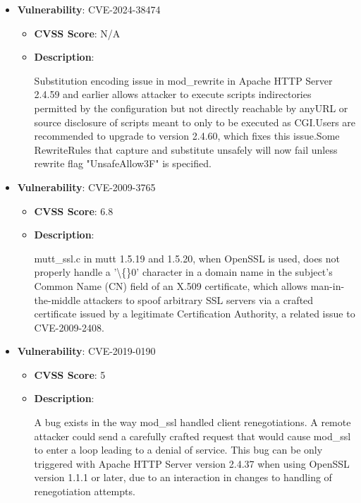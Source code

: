 \documentclass{article}
\begin{document}
\begin{itemize}
        \item \textbf{Vulnerability}: CVE-2024-38474
        \begin{itemize}
            \item \textbf{CVSS Score}:  N/A 
            \item \textbf{Description}:
            \parbox[t]{0.9\linewidth}{
                \ttfamily Substitution encoding issue in mod\_rewrite in Apache HTTP Server 2.4.59 and earlier allows attacker to execute scripts indirectories permitted by the configuration but not directly reachable by anyURL or source disclosure of scripts meant to only to be executed as CGI.Users are recommended to upgrade to version 2.4.60, which fixes this issue.Some RewriteRules that capture and substitute unsafely will now fail unless rewrite flag "UnsafeAllow3F" is specified.
            }
        \end{itemize}
    
        \item \textbf{Vulnerability}: CVE-2009-3765
        \begin{itemize}
            \item \textbf{CVSS Score}:  6.8 
            \item \textbf{Description}:
            \parbox[t]{0.9\linewidth}{
                \ttfamily mutt\_ssl.c in mutt 1.5.19 and 1.5.20, when OpenSSL is used, does not properly handle a '\textbackslash\{\}0' character in a domain name in the subject's Common Name (CN) field of an X.509 certificate, which allows man-in-the-middle attackers to spoof arbitrary SSL servers via a crafted certificate issued by a legitimate Certification Authority, a related issue to CVE-2009-2408.
            }
        \end{itemize}
    
        \item \textbf{Vulnerability}: CVE-2019-0190
        \begin{itemize}
            \item \textbf{CVSS Score}:  5 
            \item \textbf{Description}:
            \parbox[t]{0.9\linewidth}{
                \ttfamily A bug exists in the way mod\_ssl handled client renegotiations. A remote attacker could send a carefully crafted request that would cause mod\_ssl to enter a loop leading to a denial of service. This bug can be only triggered with Apache HTTP Server version 2.4.37 when using OpenSSL version 1.1.1 or later, due to an interaction in changes to handling of renegotiation attempts.
            }
        \end{itemize}
    

\end{itemize}
\end{document}
